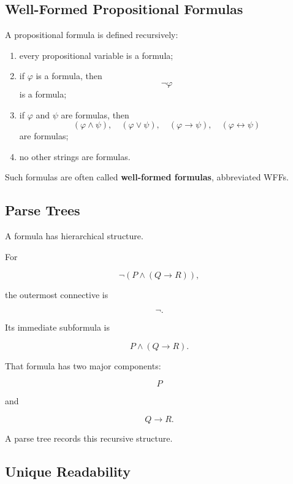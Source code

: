 \subsection{Well-Formed Propositional Formulas}
\label{subsec:wff-propositional}

A propositional formula is defined recursively:

\begin{enumerate}
    \item every propositional variable is a formula;
    \item if \(\varphi\) is a formula, then
    \[
    \neg\varphi
    \]
    is a formula;
    \item if \(\varphi\) and \(\psi\) are formulas, then
    \[
    (\varphi\land\psi),
    \quad
    (\varphi\lor\psi),
    \quad
    (\varphi\rightarrow\psi),
    \quad
    (\varphi\leftrightarrow\psi)
    \]
    are formulas;
    \item no other strings are formulas.
\end{enumerate}

Such formulas are often called \textbf{well-formed formulas}, abbreviated
WFFs.

\subsection{Parse Trees}
\label{subsec:logical-parse-trees}

A formula has hierarchical structure.

For

\[
\neg(P\land(Q\rightarrow R)),
\]

the outermost connective is

\[
\boxed{
\neg.
}
\]

Its immediate subformula is

\[
P\land(Q\rightarrow R).
\]

That formula has two major components:

\[
P
\]

and

\[
Q\rightarrow R.
\]

A parse tree records this recursive structure.

\subsection{Unique Readability}
\label{subsec:unique-readability}


